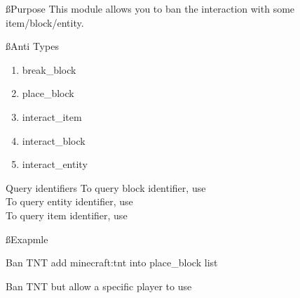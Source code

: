 
\ss{Purpose}
This module allows you to ban the interaction with some item/block/entity.

\ss{Anti Types}
\begin{enumerate}
    \item break\_block
    \item place\_block
    \item interact\_item
    \item interact\_block
    \item interact\_entity
\end{enumerate}

\begin{tips}{Query identifiers}
    To query block identifier, use \\
    To query entity identifier, use \\
    To query item identifier, use 
\end{tips}

\ss{Exapmle}
\begin{example}{Ban TNT}
    add minecraft:tnt into place\_block list
\end{example}

\begin{example}{Ban TNT but allow a specific player to use}
\end{example}


